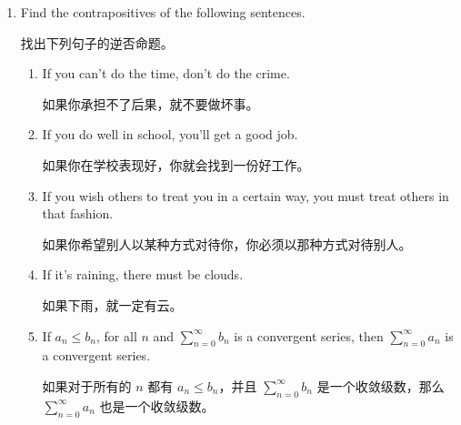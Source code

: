 \begin{enumerate}
{  你会想使用 $\vert$，即谢弗竖线，也就是与非门，因为它的真值表包含三个T和一个$\phi$——你只需要弄清楚应该否定哪个输入，以使那个唯一的$\phi$出现在表的第二行而不是第一行。
  }
  
  
  
  \item Find the contrapositives of the following sentences.
  
  找出下列句子的逆否命题。
  \begin{enumerate}
    \item \wbitemsep If you can't do the time, don't do the crime.
    
    如果你承担不了后果，就不要做坏事。
    \item \wbitemsep If you do well in school, you'll get a good job.
    
    如果你在学校表现好，你就会找到一份好工作。
    \item \wbitemsep If you wish others to treat you in a certain way, you must 
      treat others in that fashion.
      
    如果你希望别人以某种方式对待你，你必须以那种方式对待别人。
    \item \wbitemsep If it's raining, there must be clouds.
    
    如果下雨，就一定有云。
    \item \wbitemsep If $a_n \leq b_n$, for all $n$ and $\sum_{n=0}^\infty b_n$ is a 
  convergent series, then $\sum_{n=0}^\infty a_n$ is a convergent series.
  
  如果对于所有的 $n$ 都有 $a_n \leq b_n$，并且 $\sum_{n=0}^\infty b_n$ 是一个收敛级数，那么 $\sum_{n=0}^\infty a_n$ 也是一个收敛级数。
  \end{enumerate}
  
  
\end{enumerate}
